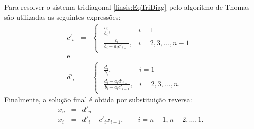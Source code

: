 Para resolver o sistema tridiagonal \eqref{linsis:EqTriDiag} pelo algoritmo de Thomas são utilizadas as seguintes expressões:
\begin{eqnarray}\label{linsis:TriDiag_1}
 c'_i &=&
\begin{cases}
\begin{array}{lcl}
  \frac{c_i}{b_i}                   , & i = 1 \\
  \frac{c_i}{b_i - a_i c'_{i - 1}}  , & i = 2, 3, \dots, n-1
\end{array}
\end{cases}\\
\text{e}\nonumber\\
d'_i &=&
\begin{cases}
\begin{array}{lcl}
  \frac{d_i}{b_i}                   , & i = 1 \\
  \frac{d_i - a_i d'_{i - 1}}{b_i - a_i c'_{i - 1}}  , & i = 2, 3, \dots, n.
\end{array}
\end{cases}
\end{eqnarray}
Finalmente, a solução final é obtida por substituição reversa:
\begin{eqnarray}\label{linsis:TriDiag_2}
x_n &=& d'_n\\
 x_i &=& d'_i - c'_i x_{i + 1}, \qquad   i = n - 1, n - 2, \ldots, 1.
\end{eqnarray}

